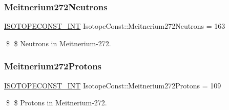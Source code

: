 \subsubsection{\texorpdfstring{Meitnerium272\+Neutrons}{Meitnerium272Neutrons}}
{\footnotesize\ttfamily \mbox{\hyperlink{group___isotope_const-_macros_ga5f18360b3e99483a35c32d789e62621c}{I\+S\+O\+T\+O\+P\+E\+C\+O\+N\+S\+T\+\_\+\+I\+NT}} Isotope\+Const\+::\+Meitnerium272\+Neutrons = 163}

\$ \$ Neutrons in Meitnerium-\/272. \mbox{\label{group___isotope_const-_meitnerium-_mt272_gad2cbd83b3d4c756306d0f9080595de34}} 
\subsubsection{\texorpdfstring{Meitnerium272\+Protons}{Meitnerium272Protons}}
{\footnotesize\ttfamily \mbox{\hyperlink{group___isotope_const-_macros_ga5f18360b3e99483a35c32d789e62621c}{I\+S\+O\+T\+O\+P\+E\+C\+O\+N\+S\+T\+\_\+\+I\+NT}} Isotope\+Const\+::\+Meitnerium272\+Protons = 109}

\$ \$ Protons in Meitnerium-\/272. 